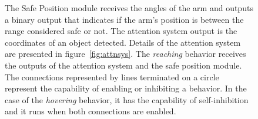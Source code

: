 \begin{figure}[htbp]
{  %
  The Safe Position module receives the angles of the arm and outputs a binary
  output that indicates if the arm's position is between the range considered
  safe or not. The attention system output is the coordinates of
  an object detected. Details of the attention system are presented
  in figure~\ref{fig:attnsys}. The \emph{reaching} behavior receives the outputs of the
  attention system and the safe position module.
  The connections represented by lines terminated on a circle
  represent the capability of enabling or inhibiting a behavior.
  In the case of the \emph{hovering} behavior, it has the capability of
  self-inhibition and it runs when both connections are enabled.
  }
\label{fig:behaviors1}
\end{figure}
%




